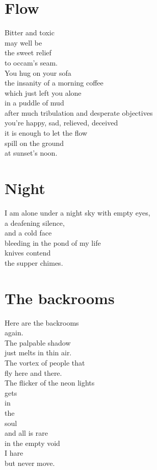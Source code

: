 \documentclass[a4paper,twoside, openany]{book}
\newenvironment{Verse}
  {\center\varwidth{\linewidth}\fontsize{18}{21.6}\selectfont}
  {\endvarwidth\endcenter}
\begin{document}
\chapter{Flow}
\begin{Verse}
Bitter and toxic \\
may well be\\
the sweet relief\\
to occam's seam.\\
You hug on your sofa\\
the insanity of a morning coffee\\
which just left you alone\\
in a puddle of mud\\
after much tribulation and desperate objectives\\
you're happy, sad, relieved, deceived\\
it is enough to let the flow\\
spill on the ground\\
at sunset's noon.
\end{Verse}
\chapter{Night}
\begin{Verse}
I am alone under a night sky with empty eyes,\\
a deafening silence,\\
and a cold face\\
bleeding in the pond of my life\\
knives contend\\
the supper chimes.
\end{Verse}
\chapter{The backrooms}
\begin{Verse}
Here are the backrooms\\
again.\\
The palpable shadow\\
just melts in thin air.\\
The vortex of people that\\
fly here and there.\\
The flicker of the neon lights\\
gets\\
in\\
the\\
soul\\
and all is rare\\
in the empty void\\
I hare\\
but never move.
\end{Verse}
\end{document}
